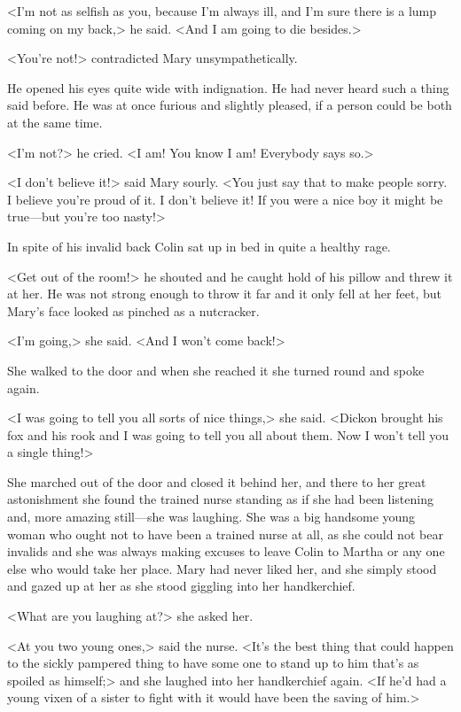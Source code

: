 <I'm not as selfish as you, because I'm always ill, and I'm sure there is a lump coming on my back,> he said. <And I am going to die besides.>

<You're not!> contradicted Mary unsympathetically.

He opened his eyes quite wide with indignation. He had never heard such a thing said before. He was at once furious and slightly pleased, if a person could be both at the same time.

<I'm not?> he cried. <I am! You know I am! Everybody says so.>

<I don't believe it!> said Mary sourly. <You just say that to make people sorry. I believe you're proud of it. I don't believe it! If you were a nice boy it might be true—but you're too nasty!>

In spite of his invalid back Colin sat up in bed in quite a healthy rage.

<Get out of the room!> he shouted and he caught hold of his pillow and threw it at her. He was not strong enough to throw it far and it only fell at her feet, but Mary's face looked as pinched as a nutcracker.

<I'm going,> she said. <And I won't come back!>

She walked to the door and when she reached it she turned round and spoke again.

<I was going to tell you all sorts of nice things,> she said. <Dickon brought his fox and his rook and I was going to tell you all about them. Now I won't tell you a single thing!>

She marched out of the door and closed it behind her, and there to her great astonishment she found the trained nurse standing as if she had been listening and, more amazing still—she was laughing. She was a big handsome young woman who ought not to have been a trained nurse at all, as she could not bear invalids and she was always making excuses to leave Colin to Martha or any one else who would take her place. Mary had never liked her, and she simply stood and gazed up at her as she stood giggling into her handkerchief.

<What are you laughing at?> she asked her.

<At you two young ones,> said the nurse. <It's the best thing that could happen to the sickly pampered thing to have some one to stand up to him that's as spoiled as himself;> and she laughed into her handkerchief again. <If he'd had a young vixen of a sister to fight with it would have been the saving of him.>

